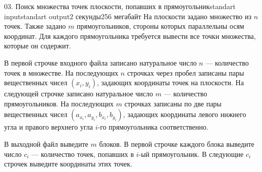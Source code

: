 \begin{problem}{03. Поиск множества точек плоскости, попавших в прямоугольник}{standart input}{standart output}{2 секунды}{256 мегабайт}
На плоскости задано множество из $n$ точек. Также задано $m$ прямоугольников, стороны которых параллельны осям координат. Для каждого прямоугольника требуется вывести все точки множества, которые он содержит.

\InputFile

В первой строчке входного файла записано натуральное число $n$ --- количество точек в множестве. На последующих $n$ строчках через пробел записаны пары вещественных чисел $(x_i, y_i)$, задающих координаты точек на плоскости.
На следующей строчке записано натуральное число $m$ --- количество прямоугольников. На последующих $m$ строчках записаны по две пары вещественных чисел $(a_{x_i}, a_{y_i}, b_{x_i}, b_{y_i})$, задающих координаты левого нижнего угла и правого верхнего угла $i$-го прямоугольника соответственно.

\OutputFile

В выходной файл выведите $m$ блоков. В первой строчке каждого блока выведите число $c_i$ --- количество точек, попавших в $i$-ый прямоугольник. В следующие $c_i$ строчек выведите координаты этих точек.

\Examples

\begin{example}%
%
\end{example}

\end{problem}
